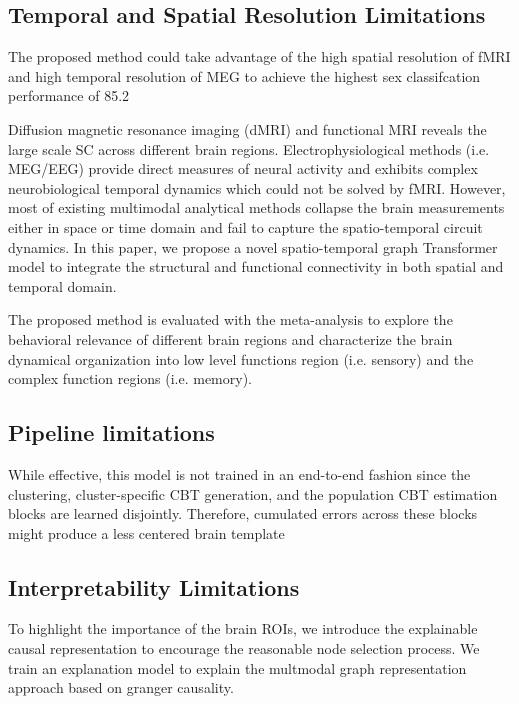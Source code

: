 \subsection{Temporal and Spatial Resolution Limitations}
The proposed method could take advantage of the high spatial 
resolution of fMRI and high temporal resolution of
MEG to achieve the highest sex classifcation performance of 85.2%
\cite{Zhao2022}

Diffusion magnetic resonance imaging (dMRI) and functional MRI reveals the large
scale SC across different brain regions. Electrophysiological methods (i.e.
MEG/EEG) provide direct measures of neural activity and exhibits complex 
neurobiological temporal dynamics which could not be solved by
fMRI. However, most of existing multimodal analytical methods collapse the brain 
measurements either in space or time domain and fail
to capture the spatio-temporal circuit dynamics. In this paper, we propose a novel 
spatio-temporal graph Transformer model to integrate the
structural and functional connectivity in both spatial and temporal domain.

The proposed method is evaluated with the meta-analysis to explore the
behavioral relevance of different brain regions and characterize the brain
dynamical organization into low level functions region (i.e. sensory) and the
complex function regions (i.e. memory).
\cite{Zhao2022a}

\subsection{Pipeline limitations}
While effective, this model is not trained in an end-to-end
fashion since the clustering, cluster-specific CBT generation, 
and the population CBT estimation blocks are learned
disjointly. Therefore, cumulated errors across these blocks
might produce a less centered brain template
\cite{Bessadok2022}

\subsection{Interpretability Limitations}
To highlight the importance of the brain ROIs, we introduce the explainable
causal representation to encourage the reasonable node selection process. We
train an explanation model to explain the multmodal graph representation approach based on granger causality.
\cite{Zhao2022}